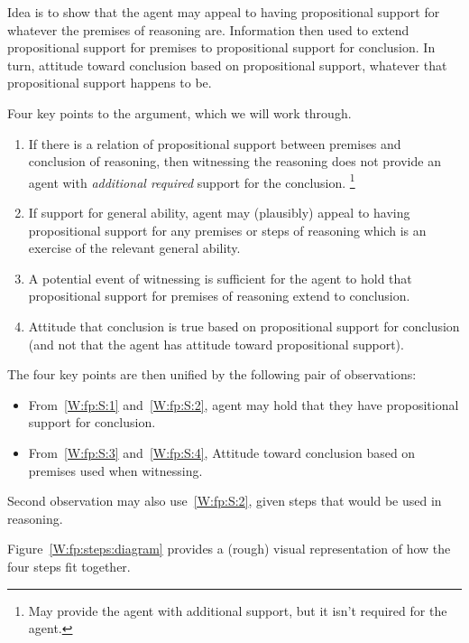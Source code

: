 \begin{note}[Idea]
  Idea is to show that the agent may appeal to having propositional support for whatever the premises of reasoning are.
  Information then used to extend propositional support for premises to propositional support for conclusion.
  In turn, attitude toward conclusion based on propositional support, whatever that propositional support happens to be.

  Four key points to the argument, which we will work through.
  \begin{enumerate}[label=(V\arabic*), ref=(V\arabic*)]
  \item\label{W:fp:S:1} If there is a relation of propositional support between premises and conclusion of reasoning, then witnessing the reasoning does not provide an agent with \emph{additional required} support for the conclusion.\nolinebreak
    \footnote{May provide the agent with additional support, but it isn't required for the agent.}
  \item\label{W:fp:S:2} If support for general ability, agent may (plausibly) appeal to having propositional support for any premises or steps of reasoning which is an exercise of the relevant general ability.
  \item\label{W:fp:S:3} A potential event of witnessing is sufficient for the agent to hold that propositional support for premises of reasoning extend to conclusion.
  \item\label{W:fp:S:4} Attitude that conclusion is true based on propositional support for conclusion (and not that the agent has attitude toward propositional support).
  \end{enumerate}
  The four key points are then unified by the following pair of observations:
  \begin{itemize}
  \item From~\ref{W:fp:S:1} and~\ref{W:fp:S:2}, agent may hold that they have propositional support for conclusion.
  \item From~\ref{W:fp:S:3} and~\ref{W:fp:S:4}, Attitude toward conclusion based on premises used when witnessing.
  \end{itemize}
  Second observation may also use~\ref{W:fp:S:2}, given steps that would be used in reasoning.

  Figure~\ref{W:fp:steps:diagram} provides a (rough) visual representation of how the four steps fit together.
\end{note}

